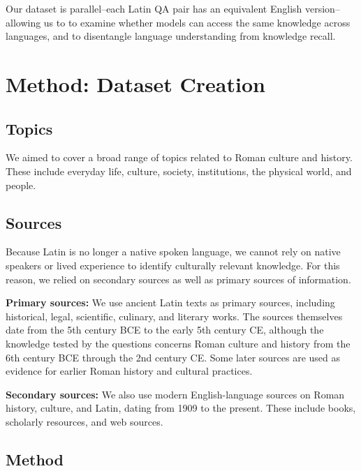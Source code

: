 \documentclass[11pt]{article}
\begin{document}
Our dataset is parallel--each Latin QA pair has an equivalent English version--allowing us to to examine whether models can access the same knowledge across languages, and to disentangle language understanding from knowledge recall.


\section{Method: Dataset Creation}




\subsection{Topics}
We aimed to cover a broad range of topics related to Roman culture and history. These include everyday life, culture, society, institutions, the physical world, and people.

\subsection{Sources} \label{sec:src_description}
Because Latin is no longer a native spoken language, we cannot rely on native speakers or lived experience to identify culturally relevant knowledge. For this reason, we relied on secondary sources as well as primary sources of information.


\textbf{Primary sources:} We use ancient Latin texts as primary sources, including historical, legal, scientific, culinary, and literary works. The sources themselves date from the 5th century BCE to the early 5th century CE, although the knowledge tested by the questions concerns Roman culture and history from the 6th century BCE through the 2nd century CE. Some later sources are used as evidence for earlier Roman history and cultural practices.

\textbf{Secondary sources:} We also use modern English-language sources on Roman history, culture, and Latin, dating from 1909 to the present. These include books, scholarly resources, and web sources.



\subsection{Method}
\end{document}
